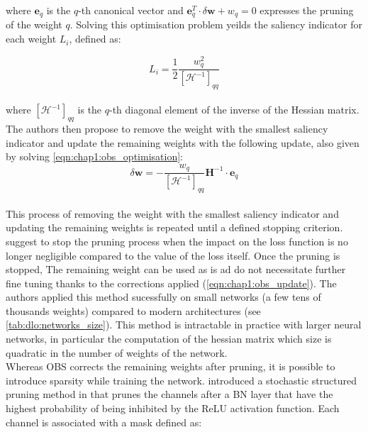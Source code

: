 \noindent where $\mathbf{e}_q$ is the $q$-th canonical vector and
$\mathbf{e}_q^T \cdot \delta \mathbf{w} + w_q = 0$ expresses the pruning of
the weight $q$. Solving this optimisation problem yeilds the saliency
indicator for each weight $L_i$, defined as:

\begin{equation}
  L_i = \frac{1}{2} \frac{w_q^2}{[\mathcal{H}^{-1}]_{qq}}
\end{equation}\\

\noindent where $[\mathcal{H}^{-1}]_{qq}$ is the $q$-th diagonal element of the
inverse of the Hessian matrix. The authors then propose to remove the weight
with the smallest saliency indicator and update the remaining weights with the
following update, also given by solving \cref{eqn:chap1:obs_optimisation}:\\

\begin{equation}
  \label{eqn:chap1:obs_update}
  \delta \mathbf{w} = - \frac{w_q}{[\mathcal{H}^{-1}]_{qq}} \mathbf{H}^{-1} \cdot \mathbf{e}_q
\end{equation}\\

This process of removing the weight with the smallest saliency indicator and
updating the remaining weights is repeated until a defined stopping criterion.
\citeauthor{DBLP:conf/nips/HassibiS92} suggest to stop the pruning process when
the impact on the loss function is no longer negligible compared to the value of
the loss itself. Once the pruning is stopped, The remaining weight can be used
as is ad do not necessitate further fine tuning thanks to the corrections
applied (\cref{eqn:chap1:obs_update}). The authors applied this method
sucessfully on small networks (a few tens of thousands weights) compared to
modern architectures (see \cref{tab:dlo:networks_size}). This method is
intractable in practice with larger neural networks, in particular the
computation of the hessian matrix which size is quadratic in the number of
weights of the network.\\

Whereas \ac{OBS} corrects the remaining weights after pruning, it is possible to
introduce sparsity while training the network.
\citeauthor{DBLP:conf/icml/KangH20} introduced a stochastic structured pruning
method in \cite{DBLP:conf/icml/KangH20} that prunes the channels after a \ac{BN}
layer that have the highest probability of being inhibited by the \ac{ReLU}
activation function. Each channel is associated with a mask defined as:\\

